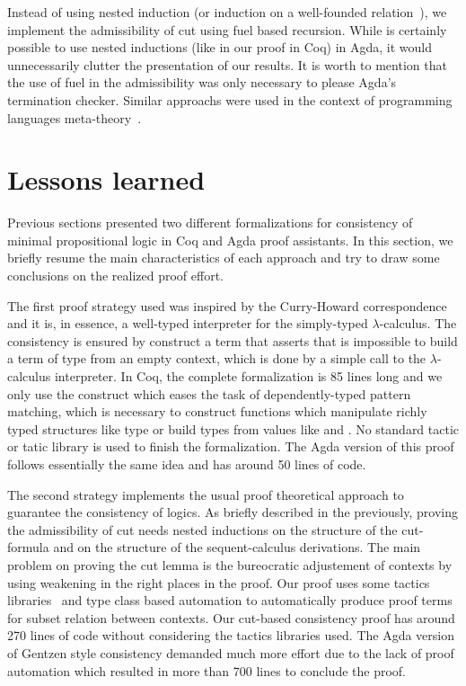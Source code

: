 Instead of using nested induction (or induction on a well-founded relation~\cite{Bertot04}), we implement the
admissibility of cut using fuel based recursion. While is certainly possible to use nested inductions
(like in our proof in Coq) in Agda, it would unnecessarily clutter the presentation of our results. It is worth to
mention that the use of fuel in the admissibility was only necessary to please Agda's termination checker. Similar
approachs were used in the context of programming languages meta-theory~\cite{Amin17}.


\section{Lessons learned}\label{sec:lessons}


Previous sections presented two different formalizations for consistency of minimal
propositional logic in Coq and Agda proof assistants. In this section, we briefly resume the
main characteristics of each approach and try to draw some conclusions on the
realized proof effort.


The first proof strategy used was inspired by the Curry-Howard correspondence and it is,
in essence, a well-typed interpreter for the
simply-typed $\lambda$-calculus. The consistency is ensured by construct a term
that asserts that is impossible to build a term of type  from an empty
context, which is done by a simple call to the $\lambda$-calculus interpreter.
In Coq, the complete formalization is 85 lines long and we only use the  construct
which eases the task of dependently-typed pattern matching, which is necessary
to construct functions which manipulate richly typed structures like type  or
build types from values like  and . No standard tactic or
tatic library is used to finish the formalization. The Agda version of this proof
follows essentially the same idea and has around 50 lines of code.


The second strategy implements the usual proof theoretical approach to guarantee
the consistency of logics. As briefly described in the previously, proving
the admissibility of cut needs nested inductions on the structure of the cut-formula
and on the structure of the sequent-calculus derivations. The main problem on proving
the cut lemma is the bureocratic adjustement of contexts by using weakening in the
right places in the proof. Our proof uses some tactics libraries~\cite{Chlipala13, Pierce18}
and type class based automation to automatically produce proof terms for subset relation
between contexts. Our cut-based consistency proof has around 270 lines of code without
considering the tactics libraries used. The Agda version of Gentzen style consistency demanded
much more effort due to the lack of proof automation which resulted in more than 700 lines to conclude
the proof.



